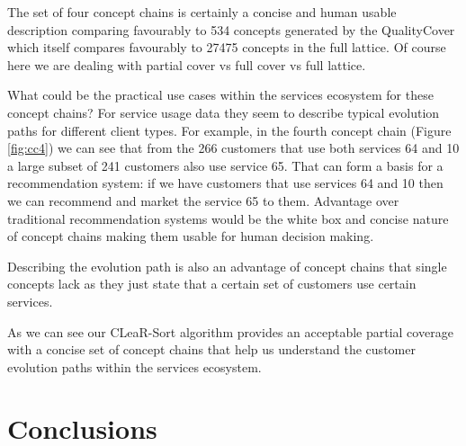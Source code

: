 \documentclass[acmconf,authordraft]{acmart}
\begin{document}
The set of four concept chains is certainly a concise and human usable description comparing favourably to 534 concepts generated by the QualityCover which itself compares favourably to 27475 concepts in the full lattice. Of course here we are dealing with partial cover vs full cover vs full lattice.

What could be the practical use cases within the services ecosystem for these concept chains? For service usage data they seem to describe typical evolution paths for different client types. For example, in the fourth concept chain (Figure \ref{fig:cc4}) we can see that from the 266 customers that use both services 64 and 10 a large subset of 241 customers also use service 65. That can form a basis for a recommendation system: if we have customers that use services 64 and 10 then we can recommend and market the service 65 to them. Advantage over traditional recommendation systems would be the white box and concise nature of concept chains making them usable for human decision making.

Describing the evolution path is also an advantage of concept chains that single concepts lack as they just state that a certain set of customers use certain services. 

As we can see our CLeaR-Sort algorithm provides an acceptable partial coverage with a concise set of concept chains that help us understand the customer evolution paths within the services ecosystem.


\section{Conclusions}





\end{document}
